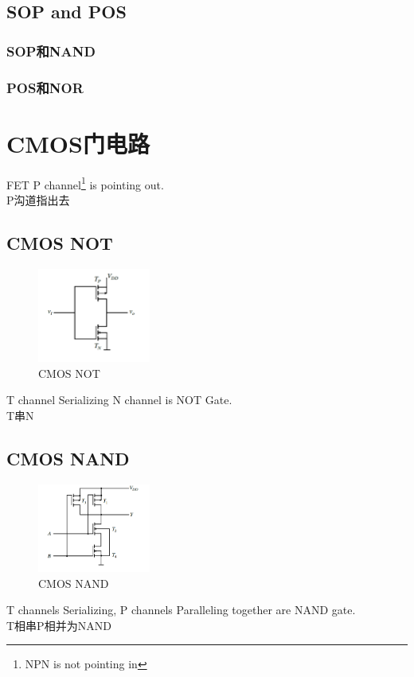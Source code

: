 \documentclass[scheme=chinese,a4paper]{report}
\begin{document}
\section{SOP and POS}
\subsection{SOP和NAND}
\subsection{POS和NOR}

\chapter{CMOS门电路}
FET P channel\footnote{NPN is not pointing in} is pointing out. \\
P沟道指出去
\section{CMOS NOT}
\begin{figure}[H]
    \centering
    \includegraphics[width=0.33\textwidth]{cmos_not.png}
    \caption{CMOS NOT}
\end{figure}
T channel Serializing N channel is NOT Gate.\\T串N
\section{CMOS NAND}
\begin{figure}[H]
\centering
\includegraphics[width=0.33\textwidth]{cmos_nand.png}
\caption{CMOS NAND}
\end{figure}
T channels Serializing, P channels Paralleling together are NAND gate. \\
T相串P相并为NAND
\end{document}
